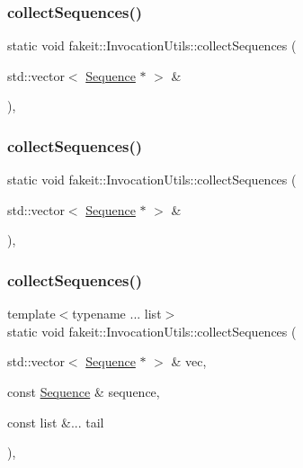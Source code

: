 \subsubsection{\texorpdfstring{collectSequences()}{collectSequences()}\hspace{0.1cm}{\footnotesize\ttfamily [11/18]}}
{\footnotesize\ttfamily static void fakeit\+::\+Invocation\+Utils\+::collect\+Sequences (\begin{DoxyParamCaption}\item[{std\+::vector$<$ \mbox{\hyperlink{classfakeit_1_1Sequence}{Sequence}} $\ast$ $>$ \&}]{ }\end{DoxyParamCaption})\hspace{0.3cm}{\ttfamily [inline]}, {\ttfamily [static]}}

\mbox{\label{structfakeit_1_1InvocationUtils_ac2d11afbe797cdd0978cf42a25c4c1a6}} 
\subsubsection{\texorpdfstring{collectSequences()}{collectSequences()}\hspace{0.1cm}{\footnotesize\ttfamily [12/18]}}
{\footnotesize\ttfamily static void fakeit\+::\+Invocation\+Utils\+::collect\+Sequences (\begin{DoxyParamCaption}\item[{std\+::vector$<$ \mbox{\hyperlink{classfakeit_1_1Sequence}{Sequence}} $\ast$ $>$ \&}]{ }\end{DoxyParamCaption})\hspace{0.3cm}{\ttfamily [inline]}, {\ttfamily [static]}}

\mbox{\label{structfakeit_1_1InvocationUtils_a43b674a2f1109acf4c870e8fb9c2571d}} 
\subsubsection{\texorpdfstring{collectSequences()}{collectSequences()}\hspace{0.1cm}{\footnotesize\ttfamily [13/18]}}
{\footnotesize\ttfamily template$<$typename ... list$>$ \\
static void fakeit\+::\+Invocation\+Utils\+::collect\+Sequences (\begin{DoxyParamCaption}\item[{std\+::vector$<$ \mbox{\hyperlink{classfakeit_1_1Sequence}{Sequence}} $\ast$ $>$ \&}]{vec,  }\item[{const \mbox{\hyperlink{classfakeit_1_1Sequence}{Sequence}} \&}]{sequence,  }\item[{const list \&...}]{tail }\end{DoxyParamCaption})\hspace{0.3cm}{\ttfamily [inline]}, {\ttfamily [static]}}

